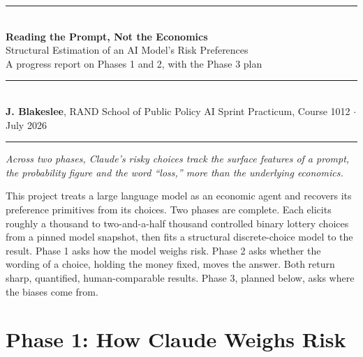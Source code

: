 \documentclass[11pt]{article}
\begin{document}
\begin{flushleft}
{\color{rulegray}\rule{\linewidth}{1.2pt}}\\[10pt]
{\LARGE\bfseries\color{ink} Reading the Prompt, Not the Economics}\\[6pt]
{\large\color{mossdk} Structural Estimation of an AI Model's Risk Preferences}\\[3pt]
{\normalsize\color{mutegray} A progress report on Phases 1 and 2, with the Phase 3 plan}\\[11pt]
{\color{rulegray}\rule{\linewidth}{0.8pt}}\\[7pt]
{\small\color{ink}\textbf{J. Blakeslee}, RAND School of Public Policy \hfill
 AI Sprint Practicum, Course 1012 \quad$\cdot$\quad July 2026}\\[3pt]
{\color{rulegray}\rule{\linewidth}{1.2pt}}
\end{flushleft}

\vspace{6pt}

\begin{tcolorbox}[
  colframe=moss, colback=mossbg, boxrule=0.5pt, sharp corners,
  left=12pt, right=12pt, top=9pt, bottom=9pt, before skip=2pt, after skip=10pt]
{\large\itshape\color{ink} Across two phases, Claude's risky choices track the surface features
of a prompt, the probability figure and the word ``loss,'' more than the underlying economics.}
\end{tcolorbox}

This project treats a large language model as an economic agent and recovers its preference
primitives from its choices. Two phases are complete. Each elicits roughly a thousand to
two-and-a-half thousand controlled binary lottery choices from a pinned model snapshot, then fits a
structural discrete-choice model to the result. Phase 1 asks how the model weighs risk. Phase 2 asks
whether the wording of a choice, holding the money fixed, moves the answer. Both return sharp,
quantified, human-comparable results. Phase 3, planned below, asks where the biases come from.

\section{Phase 1: How Claude Weighs Risk}
\end{document}
